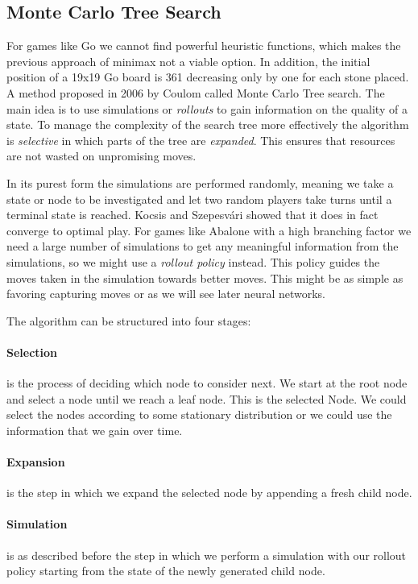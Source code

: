 \subsection{Monte Carlo Tree Search}
For games like Go we cannot find powerful heuristic functions, which makes the previous approach of minimax not a viable option. In addition, the initial position of a 19x19 Go board is 361 decreasing only by one for each stone placed. A method proposed in 2006 by Coulom \cite{coulom_efficient_2007} called Monte Carlo Tree search. The main idea is to use simulations or \textit{rollouts} to gain information on the quality of a state. To manage the complexity of the search tree more effectively the algorithm is \textit{selective} in which parts of the tree are \textit{expanded}. This ensures that resources are not wasted on unpromising moves.

In its purest form the simulations are performed randomly, meaning we take a state or node to be investigated and let two random players take turns until a terminal state is reached. Kocsis and Szepesvári \cite{kocsis_bandit_2006} showed that it does in fact converge to optimal play. For games like Abalone with a high branching factor we need a large number of simulations to get any meaningful information from the simulations, so we might use a \textit{rollout policy} instead. This policy guides the moves taken in the simulation towards better moves. This might be as simple as favoring capturing moves or as we will see later neural networks.

The algorithm can be structured into four stages:

\paragraph{Selection} is the process of deciding which node to consider next. We start at the root node and select a node until we reach a leaf node. This is the selected Node. We could select the nodes according to some stationary distribution or we could use the information that we gain over time.

\paragraph{Expansion} is the step in which we expand the selected node by appending a fresh child node.

\paragraph{Simulation} is as described before the step in which we perform a simulation with our rollout policy starting from the state of the newly generated child node.

